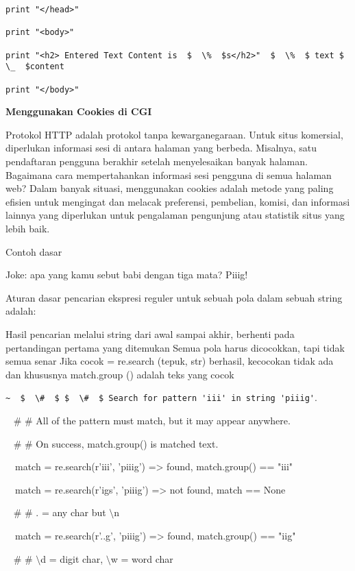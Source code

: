 \begin {enumerate}
\begin {enumerate}
\begin{verbatim}
print "</head>"

print "<body>"

print "<h2> Entered Text Content is  $  \%  $s</h2>"  $  \%  $ text $  \_  $content

print "</body>"

\end{verbatim}

{\fontsize{14pt}{14pt}\selectfont \textbf{Menggunakan Cookies di CGI} \\}

Protokol HTTP adalah protokol tanpa kewarganegaraan. Untuk situs komersial, diperlukan informasi sesi di antara halaman yang berbeda. Misalnya, satu pendaftaran pengguna berakhir setelah menyelesaikan banyak halaman. Bagaimana cara mempertahankan informasi sesi pengguna di semua halaman web? Dalam banyak situasi, menggunakan cookies adalah metode yang paling efisien untuk mengingat dan melacak preferensi, pembelian, komisi, dan informasi lainnya yang diperlukan untuk pengalaman pengunjung atau statistik situs yang lebih baik.

Contoh dasar

Joke: apa yang kamu sebut babi dengan tiga mata? Piiig!

Aturan dasar pencarian ekspresi reguler untuk sebuah pola dalam sebuah string adalah:

Hasil pencarian melalui string dari awal sampai akhir, berhenti pada pertandingan pertama yang ditemukan  Semua pola harus dicocokkan, tapi tidak semua senar Jika cocok = re.search (tepuk, str) berhasil, kecocokan tidak ada dan khususnya match.group () adalah teks yang cocok

\verb|~  $  \#  $ $  \#  $ Search for pattern 'iii' in string 'piiig'|.

~  $  \#  $ $  \#  $ All of the pattern must match, but it may appear anywhere.

~  $  \#  $ $  \#  $ On success, match.group() is matched text.

~~match = re.search(r'iii', 'piiig') =>  found, match.group() == "iii"

~~match = re.search(r'igs', 'piiig') =>  not found, match == None

~  $  \#  $ $  \#  $ . = any char but  $  \setminus  $n

~~match = re.search(r'..g', 'piiig') =>  found, match.group() == "iig"

~  $  \#  $ $  \#  $  $  \setminus  $d = digit char,  $  \setminus  $w = word char


\end{enumerate}
\end{enumerate}
